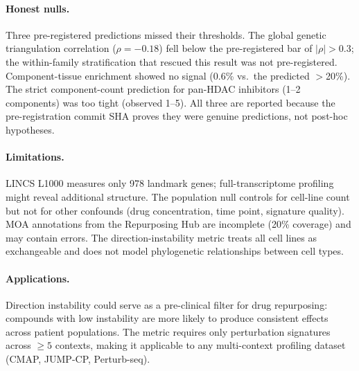 \documentclass{article}
\begin{document}
\paragraph{Honest nulls.}
Three pre-registered predictions missed their thresholds. The global
genetic triangulation correlation ($\rho = -0.18$) fell below the
pre-registered bar of $|\rho| > 0.3$; the within-family stratification
that rescued this result was not pre-registered. Component-tissue
enrichment showed no signal (0.6\% vs.\ the predicted $>$20\%). The
strict component-count prediction for pan-HDAC inhibitors (1--2
components) was too tight (observed 1--5). All three are reported
because the pre-registration commit SHA proves they were genuine
predictions, not post-hoc hypotheses.

\paragraph{Limitations.}
LINCS L1000 measures only 978 landmark genes; full-transcriptome profiling
might reveal additional structure. The population null controls for
cell-line count but not for other confounds (drug concentration, time point,
signature quality). MOA annotations from the Repurposing Hub are incomplete
(20\% coverage) and may contain errors. The direction-instability metric
treats all cell lines as exchangeable and does not model phylogenetic
relationships between cell types.

\paragraph{Applications.}
Direction instability could serve as a pre-clinical filter for drug
repurposing: compounds with low instability are more likely to produce
consistent effects across patient populations. The metric requires only
perturbation signatures across $\geq5$ contexts, making it applicable to
any multi-context profiling dataset (CMAP, JUMP-CP, Perturb-seq).



\end{document}
